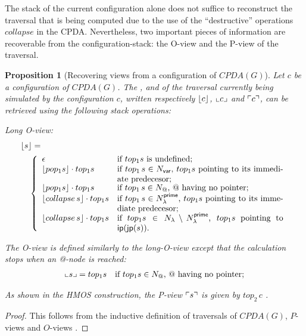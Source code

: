 \documentclass[a4paper]{article}[12pt]
\newtheorem{proposition}{Proposition}[section]
\theoremstyle{remark}
\theoremstyle{definition}
\newcommand\Nodes{N}%
\begin{document}
The stack of the current configuration alone does not suffice to reconstruct the traversal that is being computed due to the use of the ``destructive'' operations $collapse$ in the CPDA. Nevertheless, two important pieces of information are recoverable from the configuration-stack: the O-view and the P-view of the traversal. 
\begin{proposition}[Recovering views from a configuration of $CPDA(G)$]
Let $c$ be a configuration of $CPDA(G)$. The ,
 and  of the traversal currently being simulated by the configuration $c$, written respectively $\lfloor c \rfloor$, $\llcorner c \lrcorner$ and $\ulcorner c \urcorner$, can be retrieved using the following stack operations:
\begin{compactitem}
\item Long O-view:
\begin{align*}
&  \longoview{s} = \\
 & \quad \left\{
  \begin{array}{ll}
      \epsilon & \mbox{if $top_1 s$ is undefined;} \\
      \longoview{pop_1 s} \cdot top_1 s & \parbox[t]{7cm}{if $top_1\,s \in \Nodes_{\sf var}$, $top_1 s$ pointing to its immediate predecesor;} \\
      \longoview{pop_1 s} \cdot top_1 s & \mbox{if $top_1\,s \in \Nodes_@$, $@$ having no pointer;} \\
      \longoview{collapse\,s} \cdot top_1 s & \parbox[t]{7cm}{if $top_1\,s \in \Nodes_\lambda^{\sf prime}$, $top_1 s$ pointing to its immediate predecesor;} \\
      \longoview{collapse\,s} \cdot top_1 s & \parbox[t]{7cm}{if $top_1 s \in \Nodes_\lambda\setminus \Nodes_\lambda^{\sf prime}$, $top_1 s$ pointing to $\ip(\jp(s))$.}
    \end{array}
      \right.
\end{align*}
\item The O-view is defined similarly to the long-O-view except that the calculation stops when an @-node is reached:
\begin{align*}
  \oview{s}  &=   top_1 s & \mbox{if $top_1 s \in \Nodes_@$, $@$ having no pointer;}
\end{align*}
\item As shown in the HMOS construction, the P-view $\ulcorner s \urcorner$ is given by $top_2\,c$ \cite{hague-collaps-full}.
\end{compactitem}
\end{proposition}
\begin{proof}
	This follows from the inductive definition of traversals of $CPDA(G)$, $P$-views and $O$-views \cite{hague-collaps-full}.
\end{proof}
\end{document}
